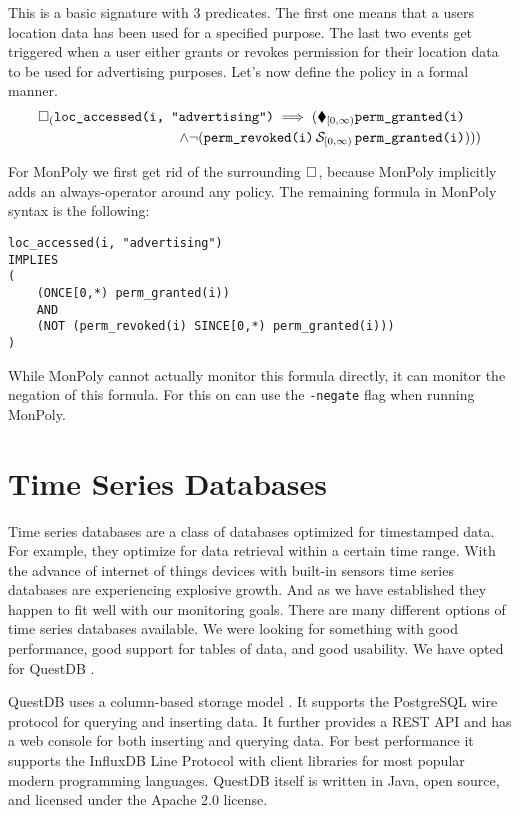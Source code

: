 This is a basic signature with 3 predicates.
The first one means that a users location data has been used for a specified purpose.
The last two events get triggered when a user either grants or revokes permission for their location data to be used for advertising purposes.
Let's now define the policy in a formal manner.
\begin{align*}
    \square_{(}\texttt{loc\_accessed(i, "advertising")}
    \implies (\blacklozenge_{[0,\infty)} &\texttt{perm\_granted(i)} \\
         \land  \neg (\texttt{perm\_revoked(i)} \,\mathcal{S}_{[0,\infty)}\, 
            &\texttt{perm\_granted(i)})))
\end{align*}

For MonPoly we first get rid of the surrounding $\square_{}$, because MonPoly implicitly adds an always-operator around any policy.
The remaining formula in MonPoly syntax is the following:

\begin{verbatim}
loc_accessed(i, "advertising")
IMPLIES 
(
    (ONCE[0,*) perm_granted(i)) 
    AND 
    (NOT (perm_revoked(i) SINCE[0,*) perm_granted(i)))
)
\end{verbatim}

While MonPoly cannot actually monitor this formula directly, it can monitor the negation of this formula.
For this on can use the \texttt{-negate} flag when running MonPoly.

\section{Time Series Databases}

Time series databases are a class of databases optimized for timestamped data.
For example, they optimize for data retrieval within a certain time range.
With the advance of internet of things devices with built-in sensors time series databases are experiencing explosive growth.
And as we have established they happen to fit well with our monitoring goals.
There are many different options of time series databases available.
We were looking for something with good performance, good support for tables of data, and good usability.
We have opted for QuestDB \cite{questdb}.

QuestDB uses a column-based storage model \cite{questdb-storage-model}.
It supports the PostgreSQL wire protocol \cite{questdb-postgres-wire} for querying and inserting data.
It further provides a REST API and has a web console for both inserting and querying data.
For best performance it supports the InfluxDB Line Protocol \cite{questdb-influx-db-line-protocol} with client libraries for most popular modern programming languages.
QuestDB itself is written in Java, open source, and licensed under the Apache 2.0 license.
 


